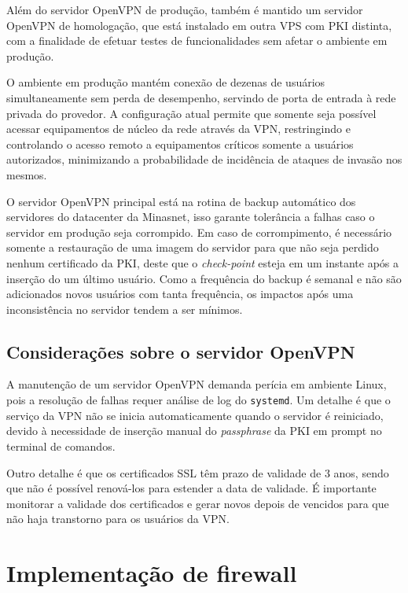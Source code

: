     Além do servidor OpenVPN de produção, também é mantido um servidor OpenVPN de homologação, que está instalado em outra VPS com PKI distinta, com a finalidade de efetuar testes de funcionalidades sem afetar o ambiente em produção.
    
    O ambiente em produção mantém conexão de dezenas de usuários simultaneamente sem perda de desempenho, servindo de porta de entrada à rede privada do provedor. A configuração atual permite que somente seja possível acessar equipamentos de núcleo da rede através da VPN, restringindo e controlando o acesso remoto a equipamentos críticos somente a usuários autorizados, minimizando a probabilidade de incidência de ataques de invasão nos mesmos.
    
    O servidor OpenVPN principal está na rotina de backup automático dos servidores do datacenter da Minasnet, isso garante tolerância a falhas caso o servidor em produção seja corrompido. Em caso de corrompimento, é necessário somente a restauração de uma imagem do servidor para que não seja perdido nenhum certificado da PKI, deste que o \textit{check-point} esteja em um instante após a inserção do um último usuário. Como a frequência do backup é semanal e não são adicionados novos usuários com tanta frequência, os impactos após uma inconsistência no servidor tendem a ser mínimos.
    
\subsection{Considerações sobre o servidor OpenVPN}

    A manutenção de um servidor OpenVPN demanda perícia em ambiente Linux, pois a resolução de falhas requer análise de log do {\tt systemd}. Um detalhe é que o serviço da VPN não se inicia automaticamente quando o servidor é reiniciado, devido à necessidade de inserção manual do \textit{passphrase} da PKI em prompt no terminal de comandos.
    
    Outro detalhe é que os certificados SSL têm prazo de validade de 3 anos, sendo que não é possível renová-los para estender a data de validade. É importante monitorar a validade dos certificados e gerar novos depois de vencidos para que não haja transtorno para os usuários da VPN.
    
\section{Implementação de firewall}

